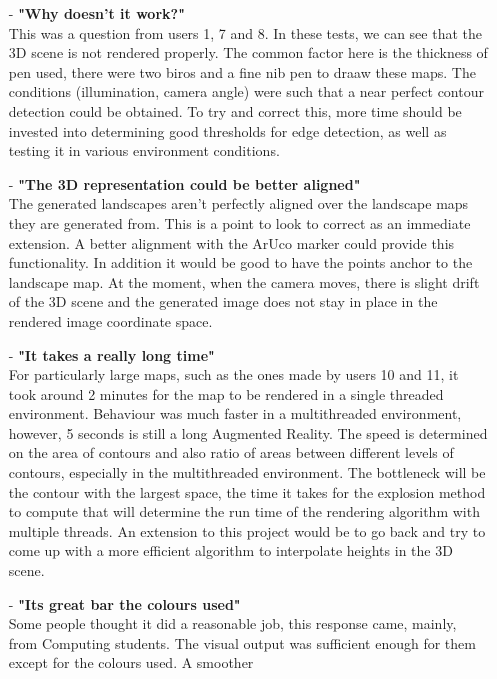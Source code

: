\documentclass[11pt]{article}
\begin{document}
\begin{itemize}
	\item[-] \textbf{"Why doesn't it work?"}\\
			This was a question from users 1, 7 and 8. In these
			tests, we can see that the 3D scene is not rendered properly.
			The common factor here is the thickness of pen used, there 
			were two biros and a fine nib pen to draaw these maps. The
			conditions (illumination, camera angle) were such that
			a near perfect contour detection could be obtained. To 
			try and correct this, more time should be invested into 
			determining good thresholds for edge detection, as well as 
			testing it in various environment conditions.
	\item[-] \textbf{"The 3D representation could be better aligned"}\\
			The generated landscapes aren't perfectly aligned over the
			landscape maps they are generated from. This is a point
			to look to correct as an immediate extension. A better alignment
			with the ArUco marker could provide this functionality. In addition
			it would be good to have the points anchor to the landscape map. At
			the moment, when the camera moves, there is slight drift of the 3D 
			scene and the generated image does not stay in place in the rendered
			image coordinate space.		
	\item[-] \textbf{"It takes a really long time"}\\
			For particularly large maps, such as the ones made by
			users 10 and 11, it took around 2 minutes for the map to be rendered
			in a single threaded environment. Behaviour was much faster
			in a multithreaded environment, however, 5 seconds is still a long
			Augmented Reality. The speed is determined on the area of contours and
			also ratio of areas between different levels of contours, especially in 
			the multithreaded environment. The bottleneck will be the contour with
			the largest space, the time it takes for the explosion method to compute
			that will determine the run time of the rendering algorithm 
			with multiple threads. An extension to this project would be to go back and
			try to come up with a more efficient algorithm to interpolate heights in 
			the 3D scene.
	\item[-] \textbf{"Its great bar the colours used"}\\
			Some people thought it did a reasonable job, this response
			came, mainly, from Computing students. The visual output was 
			sufficient enough for them except for the colours used. A smoother

\end{itemize}
\end{document}
